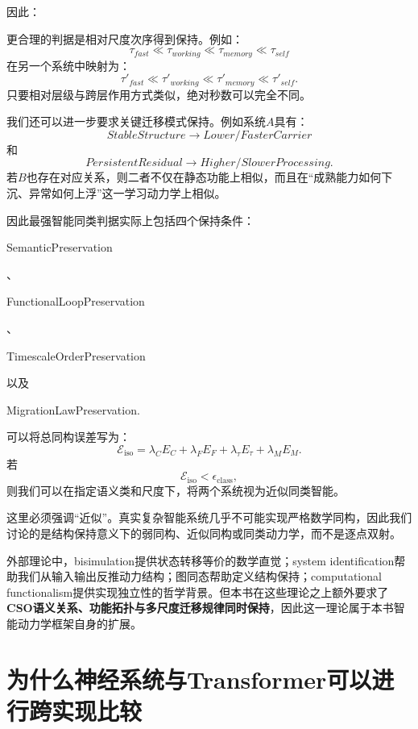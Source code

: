 因此：
\begin{statementbox}
\centering
{}
\end{statementbox}
更合理的判据是相对尺度次序得到保持。例如：
\[
\tau_{fast}
\ll
\tau_{working}
\ll
\tau_{memory}
\ll
\tau_{self}
\]
在另一个系统中映射为：
\[
\tau'_{fast}
\ll
\tau'_{working}
\ll
\tau'_{memory}
\ll
\tau'_{self}.
\]
只要相对层级与跨层作用方式类似，绝对秒数可以完全不同。

我们还可以进一步要求关键迁移模式保持。例如系统$A$具有：
\[
StableStructure
\rightarrow
Lower/FasterCarrier
\]
和
\[
PersistentResidual
\rightarrow
Higher/SlowerProcessing.
\]
若$B$也存在对应关系，则二者不仅在静态功能上相似，而且在``成熟能力如何下沉、异常如何上浮''这一学习动力学上相似。

因此最强智能同类判据实际上包括四个保持条件：
\begin{statementbox}
SemanticPreservation
\end{statementbox}
、
\begin{statementbox}
FunctionalLoopPreservation
\end{statementbox}
、
\begin{statementbox}
TimescaleOrderPreservation
\end{statementbox}
以及
\begin{statementbox}
MigrationLawPreservation.
\end{statementbox}

可以将总同构误差写为：
\[
\mathcal E_{\mathrm{iso}}
=
\lambda_C E_C
+
\lambda_F E_F
+
\lambda_\tau E_\tau
+
\lambda_M E_M.
\]
若
\[
\mathcal E_{\mathrm{iso}}
<
\epsilon_{\mathrm{class}},
\]
则我们可以在指定语义类和尺度下，将两个系统视为近似同类智能。

这里必须强调``近似''。真实复杂智能系统几乎不可能实现严格数学同构，因此我们讨论的是结构保持意义下的弱同构、近似同构或同类动力学，而不是逐点双射。

外部理论中，bisimulation提供状态转移等价的数学直觉；system identification帮助我们从输入输出反推动力结构；图同态帮助定义结构保持；computational functionalism提供实现独立性的哲学背景。但本书在这些理论之上额外要求了\textbf{CSO语义关系、功能拓扑与多尺度迁移规律同时保持}，因此这一理论属于本书智能动力学框架自身的扩展。

\section{为什么神经系统与Transformer可以进行跨实现比较}

